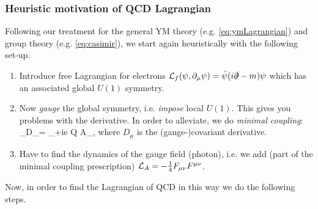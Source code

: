 \subsubsection{Heuristic motivation of QCD Lagrangian}
Following our treatment for the general YM theory (e.g. \ref{eq:ymLagrangian}) and group theory (e.g. \ref{eq:casimir}), we 
start again heuristically with the following set-up.
\begin{enumerate}
	\item Introduce free Lagrangian for electrons $\mathcal{L}_f(\psi,\partial_\mu \psi)=\bar{\psi} (i \slashed{\partial}-m) \psi$ which has an associated global $U(1)$ symmetry.
	\item Now \emph{gauge} the global symmetry, i.e. \emph{impose} local $U(1)$. This gives you problems with the derivative. In order to alleviate, we do \emph{minimal coupling}:
	\bse 
	\partial_\mu \longrightarrow D_\mu = \partial_\mu +ie Q A_\mu,
	\ese 
	where $D_\mu$ is the (gauge-)covariant derivative.
	\item Have to find the dynamics of the gauge field (photon), i.e. we add (part of the minimal coupling prescription) $\mathcal{L}_A=-\frac{1}{4}F_{\mu \nu}F^{\mu \nu}$.
\end{enumerate}
Now, in order to find the Lagrangian of QCD in this way we do the following steps.
